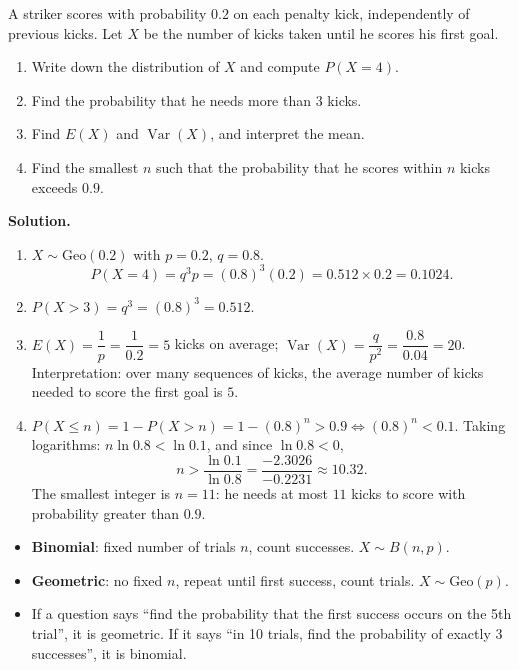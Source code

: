 \documentclass[11pt]{article}
\begin{document}
\begin{exoresolu}
A striker scores with probability $0.2$ on each penalty kick, independently of previous kicks. Let $X$ be the number of kicks taken until he scores his first goal.
\begin{enumerate}
\item Write down the distribution of $X$ and compute $P(X = 4)$.
\item Find the probability that he needs more than $3$ kicks.
\item Find $E(X)$ and $\operatorname{Var}(X)$, and interpret the mean.
\item Find the smallest $n$ such that the probability that he scores within $n$ kicks exceeds $0.9$.
\end{enumerate}
\tcblower
\textbf{Solution.}
\begin{enumerate}
\item $X \sim \mathrm{Geo}(0.2)$ with $p = 0.2$, $q = 0.8$.
\[ P(X = 4) = q^{3}p = (0.8)^{3}(0.2) = 0.512 \times 0.2 = 0.1024. \]
\item $P(X > 3) = q^{3} = (0.8)^{3} = 0.512$.
\item $E(X) = \dfrac{1}{p} = \dfrac{1}{0.2} = 5$ kicks on average; $\operatorname{Var}(X) = \dfrac{q}{p^{2}} = \dfrac{0.8}{0.04} = 20$.
Interpretation: over many sequences of kicks, the average number of kicks needed to score the first goal is $5$.
\item $P(X \leq n) = 1 - P(X > n) = 1 - (0.8)^{n} > 0.9 \iff (0.8)^{n} < 0.1$.
Taking logarithms: $n \ln 0.8 < \ln 0.1$, and since $\ln 0.8 < 0$,
\[ n > \frac{\ln 0.1}{\ln 0.8} = \frac{-2.3026}{-0.2231} \approx 10.32. \]
The smallest integer is $n = 11$: he needs at most $11$ kicks to score with probability greater than $0.9$.
\end{enumerate}
\end{exoresolu}

\begin{attention}
\begin{itemize}
\item \textbf{Binomial}: fixed number of trials $n$, count successes. $X \sim B(n,p)$.
\item \textbf{Geometric}: no fixed $n$, repeat until first success, count trials. $X \sim \mathrm{Geo}(p)$.
\item If a question says ``find the probability that the first success occurs on the 5th trial'', it is geometric. If it says ``in 10 trials, find the probability of exactly 3 successes'', it is binomial.
\end{itemize}
\end{attention}
\end{document}

